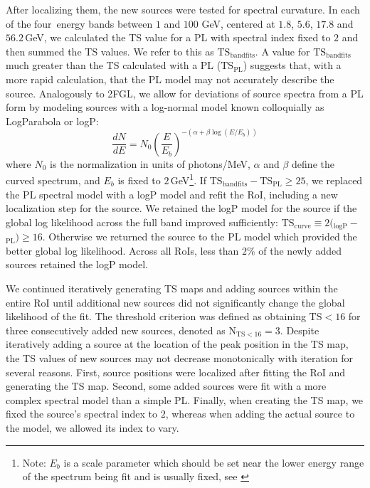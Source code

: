 After localizing them, the new sources were tested for spectral curvature. In each of the four~energy bands between $1$ and $100$ GeV, centered at $1.8$, $5.6$, $17.8$ and $56.2$\,GeV, we calculated the TS value for a PL with spectral index fixed to $2$ and then summed the TS values. We refer to this as $\mathrm{TS_{band fits}}$. A value for $\mathrm{TS_{band fits}}$ much greater than the TS calculated with a PL ($\mathrm{TS_{PL}}$) suggests that, with a more rapid calculation, that the PL model may not accurately describe the source. Analogously to 2FGL, we allow for deviations of source spectra from a PL form by modeling sources with a log-normal model known colloquially as LogParabola or logP:
\begin{equation}
\newcommand{\pfrac}[2]{\left(\frac{#1}{#2}\right)} \frac{dN}{dE} = N_0\pfrac{E}{E_b}^{-(\alpha + \beta\log(E/E_b))}
\label{eqn:logP}
\end{equation}
where $N_0$ is the normalization in units of photons/MeV, $\alpha$ and $\beta$ define the curved spectrum, and $E_b$ is fixed to $2$\,GeV\footnote{Note: $E_b$ is a scale parameter which should be set near the lower energy range of the spectrum being fit and is usually fixed, see \citet{massaro04}}. If $\mathrm{TS_{band fits} - TS_{PL}} \geq 25$, we replaced the PL spectral model with a logP model and refit the RoI, including a new localization step for the source. We retained the logP model for the source if the global log likelihood across the full band improved sufficiently: 
$\mathrm{TS_{curve}} \equiv 2 ($\logL{}$_{\mathrm{logP}}-$\logL{}$_{\mathrm{PL}}) \geq 16$. 
Otherwise we returned the source to the PL model which provided the better global log likelihood. Across all RoIs, less than $2\%$ of the newly added sources retained the logP model. 

We continued iteratively generating TS maps and adding sources within the entire RoI until additional new sources did not significantly change the global likelihood of the fit. The threshold criterion was defined as obtaining $\mathrm{TS < 16}$ for three consecutively added new sources, denoted as $\mathrm{N_{TS < 16} = 3}$. Despite iteratively adding a source at the location of the peak position in the TS map, the TS values of new sources may not decrease monotonically with iteration for several reasons. First, source positions were localized after fitting the RoI and generating the TS map. Second, some added sources were fit with a more complex spectral model than a simple PL. Finally, when creating the TS map, we fixed the source's spectral index to $2$, whereas when adding the actual source to the model, we allowed its index to vary. 

